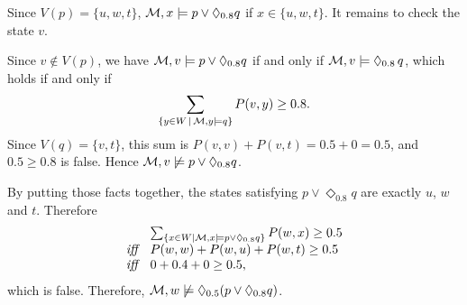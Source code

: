 \begin{example}
Since $V(p)=\{u,w,t\}$, $\mathcal{M},x\models p \vee \Diamond_{0.8} q$ if $x\in\{u,w,t\}$. 
It remains to check the state $v$.

Since $v\notin V(p)$, we have $\mathcal{M},v\models p \vee \Diamond_{0.8} q$ if and only if
$\mathcal{M},v\models \Diamond_{0.8}\, q$, which holds if and only if
\[
\sum_{\{y\in W \,\mid\, \mathcal{M},y\models q\}} P(v,y) \geq 0.8 .
\]
Since $V(q)=\{v,t\}$, this sum is $P(v,v)+P(v,t)=0.5+0=0.5$, and
$0.5\geq 0.8$ is false. Hence $\mathcal{M},v\not\models p \vee \Diamond_{0.8} q$.

By putting those facts together, the states satisfying $p \vee \Diamond_{0.8} q$ are exactly
$u$, $w$ and $t$. Therefore
\[
\begin{array}{ll}
& \sum_{\{x\in W \mid \mathcal{M},x\models p \vee \Diamond_{0.8} q\}} P(w,x) \geq 0.5 \\
\text{\it iff} &  P(w,w)+P(w,u)+P(w,t) \geq 0.5 \\
\text{\it iff} & 0+0.4+0 \geq 0.5,
\end{array}
\]
which is false. Therefore, $\mathcal{M},w \not\models \Diamond_{0.5}(p \vee \Diamond_{0.8} q)$.








\end{example}


